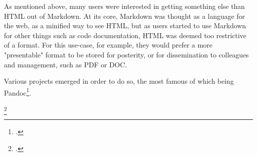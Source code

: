As mentioned above, many users were interested in getting something else than HTML out of Markdown. At its core, Markdown was thought as
a language for the web, as a minified way to see HTML, but as users started to use Markdown for other things such as code documentation,
HTML was deemed too restrictive of a format. For this use-case, for example, they would prefer a more "presentable" format to be stored
for posterity, or for dissemination to colleagues and management, such as PDF or DOC.\newline

Various projects emerged in order to do so, the most famous of which being Pandoc\footcite{pandoc}.

\footcite{dominici2014overview}